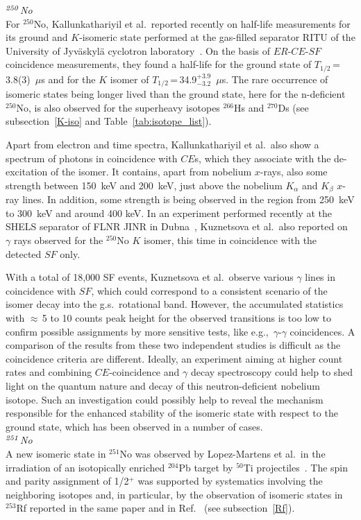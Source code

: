 {\it $^{\it250}$No}\\ 
For $^{250}$No, Kallunkathariyil et al.~reported recently on half-life measurements for its ground and $K$-isomeric state performed at the gas-filled separator RITU of the University of Jyv\"{a}skyl\"{a} cyclotron laboratory~\cite{Kallunkathariyil2020}.  
On the basis of $ER$-$CE$-$SF$ coincidence measurements, they found a half-life for the ground state of $T_{1/2}$\,=\,3.8(3)~$\mu$s and for the $K$ isomer of $T_{1/2}$\,=\,34.9$^{+3.9}_{-3.2}$~$\mu$s. 
The rare occurrence of isomeric states being longer lived than the ground state, here for the n-deficient $^{250}$No, is also observed for the superheavy isotopes $^{266}$Hs and $^{270}$Ds (see subsection~\ref{K-iso} and Table~\ref{tab:isotope_list}).

Apart from electron and time spectra, Kallunkathariyil et al.~also show a spectrum of photons in coincidence with $CE$s, which they associate with the de-excitation of the isomer. 
It contains, apart from nobelium $x$-rays, also some strength between 150~keV and 200~keV, just above the nobelium $K_\alpha$ and $K_\beta$ $x$-ray lines. 
In addition, some strength is being observed in the region from 250~keV to 300~keV and around 400 keV.
In an experiment performed recently at the SHELS separator of FLNR JINR in Dubna~\cite{Kuznetsova2020}, Kuznetsova et al.~also reported on $\gamma$ rays observed for the $^{250}$No $K$ isomer, this time in coincidence with the detected $SF$ only. 

With a total of 18,000 SF events, Kuznetsova et al.~observe various $\gamma$ lines in coincidence with $SF$, which could correspond to a consistent scenario of the isomer decay into the g.s.~rotational band.
However, the accumulated statistics with $\approx$\,5 to 10 counts peak height for the observed transitions is too low to confirm possible assignments by more sensitive tests, like e.g.,~$\gamma$-$\gamma$ coincidences. 
A comparison of the results from these two independent studies is difficult as the coincidence criteria are different. 
Ideally, an experiment aiming at higher count rates and combining $CE$-coincidence and $\gamma$ decay spectroscopy could help to shed light on the quantum nature and decay of this neutron-deficient nobelium isotope. 
Such an investigation could possibly help to reveal the mechanism responsible for the enhanced stability of the isomeric state with respect to the ground state, which has been observed in a number of cases.\\


{\it $^{\it251}$No}\\ 
A new isomeric state in $^{251}$No was observed by Lopez-Martens et al.~in the irradiation of an isotopically enriched $^{204}$Pb target by $^{50}$Ti projectiles~\cite{Lopez-Martens2022}. 
The spin and parity assignment of 1/2$^+$ was supported by systematics involving the neighboring  isotopes and, in particular, by the observation of isomeric states in $^{253}$Rf reported in the same paper and in Ref.~\cite{Khuyagbaatar2021} (see subsection~\ref{Rf}).\\ 

